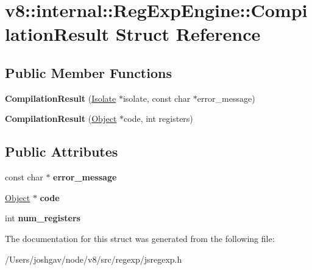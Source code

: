 \hypertarget{structv8_1_1internal_1_1_reg_exp_engine_1_1_compilation_result}{}\section{v8\+:\+:internal\+:\+:Reg\+Exp\+Engine\+:\+:Compilation\+Result Struct Reference}
\label{structv8_1_1internal_1_1_reg_exp_engine_1_1_compilation_result}
\subsection*{Public Member Functions}
\begin{DoxyCompactItemize}
\item 
{\bfseries Compilation\+Result} (\hyperlink{classv8_1_1internal_1_1_isolate}{Isolate} $\ast$isolate, const char $\ast$error\+\_\+message)\hypertarget{structv8_1_1internal_1_1_reg_exp_engine_1_1_compilation_result_ae09fb0e61981b463c8e0bd3dc7e0d7a0}{}\label{structv8_1_1internal_1_1_reg_exp_engine_1_1_compilation_result_ae09fb0e61981b463c8e0bd3dc7e0d7a0}

\item 
{\bfseries Compilation\+Result} (\hyperlink{classv8_1_1internal_1_1_object}{Object} $\ast$code, int registers)\hypertarget{structv8_1_1internal_1_1_reg_exp_engine_1_1_compilation_result_add8747981b5647a04f2fec660508c893}{}\label{structv8_1_1internal_1_1_reg_exp_engine_1_1_compilation_result_add8747981b5647a04f2fec660508c893}

\end{DoxyCompactItemize}
\subsection*{Public Attributes}
\begin{DoxyCompactItemize}
\item 
const char $\ast$ {\bfseries error\+\_\+message}\hypertarget{structv8_1_1internal_1_1_reg_exp_engine_1_1_compilation_result_ad87d97fff0bf6049606dbd0e85e58648}{}\label{structv8_1_1internal_1_1_reg_exp_engine_1_1_compilation_result_ad87d97fff0bf6049606dbd0e85e58648}

\item 
\hyperlink{classv8_1_1internal_1_1_object}{Object} $\ast$ {\bfseries code}\hypertarget{structv8_1_1internal_1_1_reg_exp_engine_1_1_compilation_result_a13957b8f71d31e21b4ff5f5add20f283}{}\label{structv8_1_1internal_1_1_reg_exp_engine_1_1_compilation_result_a13957b8f71d31e21b4ff5f5add20f283}

\item 
int {\bfseries num\+\_\+registers}\hypertarget{structv8_1_1internal_1_1_reg_exp_engine_1_1_compilation_result_ae0cb9918f7a58118e48f3709483f6a29}{}\label{structv8_1_1internal_1_1_reg_exp_engine_1_1_compilation_result_ae0cb9918f7a58118e48f3709483f6a29}

\end{DoxyCompactItemize}


The documentation for this struct was generated from the following file\+:\begin{DoxyCompactItemize}
\item 
/\+Users/joshgav/node/v8/src/regexp/jsregexp.\+h\end{DoxyCompactItemize}
